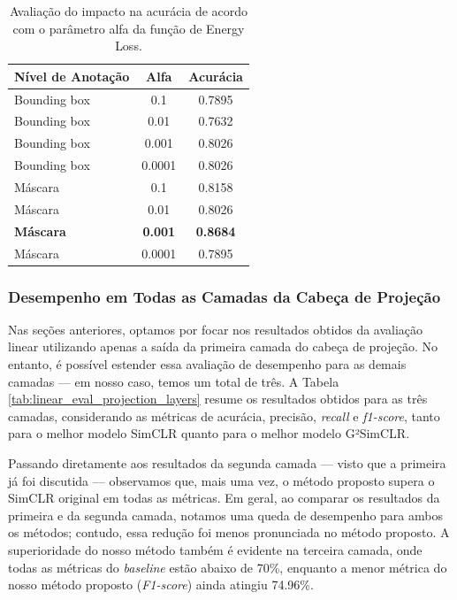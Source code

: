 \begin{table}[h] %
  \centering
  \caption{Avaliação do impacto na acurácia de acordo com o parâmetro alfa da função de Energy Loss.}
  \label{tab:linear_eval_annotation_alpha}
  \setlength{\tabcolsep}{6pt}
  \begin{tabular}{lcc}
    \toprule
    Nível de Anotação & Alfa & Acurácia \\
    \midrule
    Bounding box & 0.1    & 0.7895 \\
    Bounding box & 0.01   & 0.7632 \\
    Bounding box & 0.001  & 0.8026 \\
    Bounding box & 0.0001 & 0.8026 \\
    Máscara            & 0.1    & 0.8158 \\
    Máscara            & 0.01   & 0.8026 \\
    \textbf{Máscara}   & \textbf{0.001}  & \textbf{0.8684} \\
    Máscara            & 0.0001 & 0.7895 \\
    \bottomrule
  \end{tabular}
\end{table}


\subsubsection{Desempenho em Todas as Camadas da Cabeça de Projeção}

Nas seções anteriores, optamos por focar nos resultados obtidos da avaliação linear utilizando apenas a saída da primeira camada do cabeça de projeção. No entanto, é possível estender essa avaliação de desempenho para as demais camadas — em nosso caso, temos um total de três. A Tabela \ref{tab:linear_eval_projection_layers} resume os resultados obtidos para as três camadas, considerando as métricas de acurácia, precisão, \textit{recall} e \textit{f1-score}, tanto para o melhor modelo SimCLR quanto para o melhor modelo G²SimCLR.

Passando diretamente aos resultados da segunda camada — visto que a primeira já foi discutida — observamos que, mais uma vez, o método proposto supera o SimCLR original em todas as métricas. Em geral, ao comparar os resultados da primeira e da segunda camada, notamos uma queda de desempenho para ambos os métodos; contudo, essa redução foi menos pronunciada no método proposto. A superioridade do nosso método também é evidente na terceira camada, onde todas as métricas do \textit{baseline} estão abaixo de 70\%, enquanto a menor métrica do nosso método proposto (\textit{F1-score}) ainda atingiu 74.96\%.


